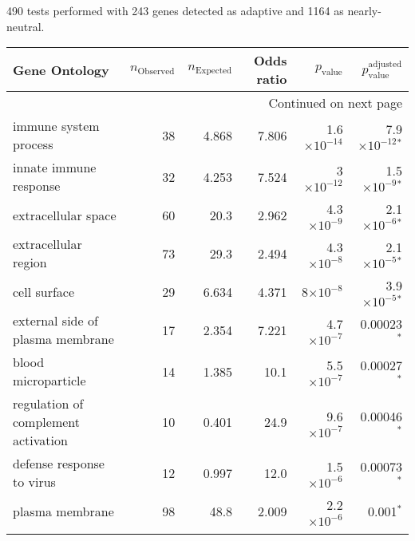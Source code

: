 490 tests performed with 243 genes detected as adaptive and 1164 as nearly-neutral.
\scriptsize
\begin{longtable}{|l|r|r|r|r|r|}
\toprule
                                Gene Ontology & $n_{\mathrm{Observed}}$ & $n_{\mathrm{Expected}}$ & Odds ratio &     $p_{\mathrm{value}}$ &      $p_{\mathrm{value}}^{\mathrm{adjusted}}$ \\
\midrule
\endhead
\midrule
\multicolumn{6}{r}{{Continued on next page}} \\
\midrule
\endfoot

\bottomrule
\endlastfoot
                        immune system process &                      38 &                   4.868 &      7.806 & 1.6$\times 10^{-14}$ &  7.9$\times 10^{-12}$$\bm{^*}$ \\
                       innate immune response &                      32 &                   4.253 &      7.524 &   3$\times 10^{-12}$ &   1.5$\times 10^{-9}$$\bm{^*}$ \\
                          extracellular space &                      60 &                    20.3 &      2.962 &  4.3$\times 10^{-9}$ &   2.1$\times 10^{-6}$$\bm{^*}$ \\
                         extracellular region &                      73 &                    29.3 &      2.494 &  4.3$\times 10^{-8}$ &   2.1$\times 10^{-5}$$\bm{^*}$ \\
                                 cell surface &                      29 &                   6.634 &      4.371 &    8$\times 10^{-8}$ &   3.9$\times 10^{-5}$$\bm{^*}$ \\
             external side of plasma membrane &                      17 &                   2.354 &      7.221 &  4.7$\times 10^{-7}$ &               0.00023$\bm{^*}$ \\
                          blood microparticle &                      14 &                   1.385 &       10.1 &  5.5$\times 10^{-7}$ &               0.00027$\bm{^*}$ \\
          regulation of complement activation &                      10 &                   0.401 &       24.9 &  9.6$\times 10^{-7}$ &               0.00046$\bm{^*}$ \\
                    defense response to virus &                      12 &                   0.997 &       12.0 &  1.5$\times 10^{-6}$ &               0.00073$\bm{^*}$ \\
                              plasma membrane &                      98 &                    48.8 &      2.009 &  2.2$\times 10^{-6}$ &                 0.001$\bm{^*}$ \\
$$
\end{longtable}
